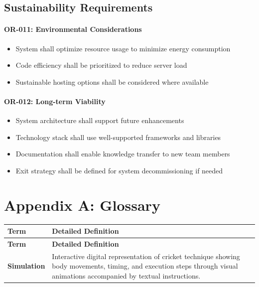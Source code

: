 \documentclass[12pt,a4paper]{article}
\begin{document}
\begin{enumerate}
\subsection{Sustainability Requirements}

\paragraph{OR-011: Environmental Considerations}
\begin{itemize}
    \item System shall optimize resource usage to minimize energy consumption
    \item Code efficiency shall be prioritized to reduce server load
    \item Sustainable hosting options shall be considered where available
\end{itemize}

\paragraph{OR-012: Long-term Viability}
\begin{itemize}
    \item System architecture shall support future enhancements
    \item Technology stack shall use well-supported frameworks and libraries
    \item Documentation shall enable knowledge transfer to new team members
    \item Exit strategy shall be defined for system decommissioning if needed
\end{itemize}

\appendix

\section{Appendix A: Glossary}
\begin{longtable}{|p{4cm}|p{10cm}|}
\hline
\textbf{Term} & \textbf{Detailed Definition} \\ \hline
\endfirsthead
\hline
\textbf{Term} & \textbf{Detailed Definition} \\ \hline
\endhead
\hline
\endfoot

\textbf{Simulation} & Interactive digital representation of cricket technique showing body movements, timing, and execution steps through visual animations accompanied by textual instructions. \\ \hline


\end{longtable}
\end{enumerate}
\end{document}
